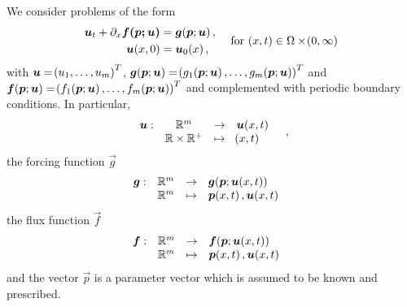 \documentclass{amsart}
\theoremstyle{definition}
\theoremstyle{remark}
\numberwithin{equation}{section}
\begin{document}
\begin{Defn} We consider problems of the form 
	\begin{equation}\label{eq:1d_gen_balance_law_system}
	\begin{aligned}
	\vec{u}_t+\partial_x\vec{f \qp{\vec{p}; \vec{u}}}&=\vec{g}\qp{\vec p;\vec u},\\
	\vec{u}\qp{x,0}&=\vec{u}_0\qp{x},
	\end{aligned}\quad \text{ for } \qp{x,t}\in \W\times\qp{0,\infty}
	\end{equation}
	with $\vec{u}=\qp{u_1,\dots,u_m}^T$, $\vec{g}\qp{\vec{p}; \vec{u}}=\qp{g_1\qp{\vec{p};\vec{u}},\dots,g_m\qp{\vec{p};\vec{u}}}^T$ and $\vec{f}\qp{\vec{p}; \vec{u}}=\qp{f_1\qp{\vec{p};\vec{u}},\dots,f_m\qp{\vec{p};\vec{u}}}^T$ and complemented with periodic boundary conditions.
	In particular,
	\begin{equation}
	\dfunkmapsto{\vec{u}}{\mathbb{R}\times\mathbb{R}^+}{\mathbb{R}^m}{\qp{x,t}}{\vec{u}\qp{x,t}},
	\end{equation}
	the forcing function $\vec{g}$
	\begin{equation}
	\dfunkmapsto{\vec{g}}{\mathbb{R}^m}{\mathbb{R}^m}{\vec p\qp{x,t}, \vec{u}\qp{x,t}}{\vec{g}\qp{\vec p; \vec{u}\qp{x,t}}}
	\end{equation}
	the flux function $\vec{f}$
	\begin{equation}
	\dfunkmapsto{\vec{f}}{\mathbb{R}^m}{\mathbb{R}^m}{\vec p\qp {x,t}, \vec{u}\qp{x,t}}{\vec{f}\qp{\vec p; \vec{u}\qp{x,t}}}
	\end{equation}
	and the vector $\vec{p}$ is a parameter vector which is assumed to be known and prescribed. 
\end{Defn}
\end{document}
